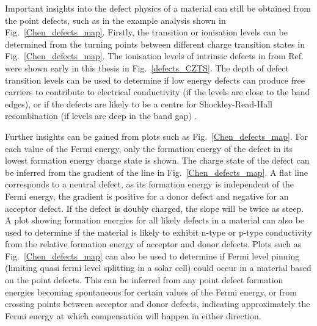 \documentclass[11pt, twoside]{report}
\begin{document}
Important insights into the defect physics of a material can still be obtained from the point defects, such as in the example analysis shown in Fig.~\ref{Chen_defects_map}. Firstly, the transition or ionisation levels can be determined from the turning points between different charge transition states in Fig.~\ref{Chen_defects_map}. The ionisation levels of intrinsic defects in {\CZTS} from Ref.~ were shown early in this thesis in Fig.~\ref{defects_CZTS}. The depth of defect transition levels can be used to determine if low energy defects can produce free carriers to contribute to electrical conductivity (if the levels are close to the band edges), or if the defects are likely to be a centre for Shockley-Read-Hall recombination (if levels are deep in the band gap) \cite{Aron_defect_tolerance}.

Further insights can be gained from plots such as Fig.~\ref{Chen_defects_map}. For each value of the Fermi energy, only the formation energy of the defect in its lowest formation energy charge state is shown. The charge state of the defect can be inferred from the gradient of the line in Fig.~\ref{Chen_defects_map}. A flat line corresponds to a neutral defect, as its formation energy is independent of the Fermi energy, the gradient is positive for a donor defect and negative for an acceptor defect. If the defect is doubly charged, the slope will be twice as steep. A plot showing formation energies for all likely defects in a material can also be used to determine if the material is likely to exhibit n-type or p-type conductivity from the relative formation energy of acceptor and donor defects. Plots such as Fig.~\ref{Chen_defects_map} can also be used to determine if Fermi level pinning (limiting quasi fermi level splitting in a solar cell) could occur in a material based on the point defects. This can be inferred from any point defect formation energies becoming spontaneous for certain values of the Fermi energy, or from crossing points between acceptor and donor defects, indicating approximately the Fermi energy at which compensation will happen in either direction.
\end{document}
